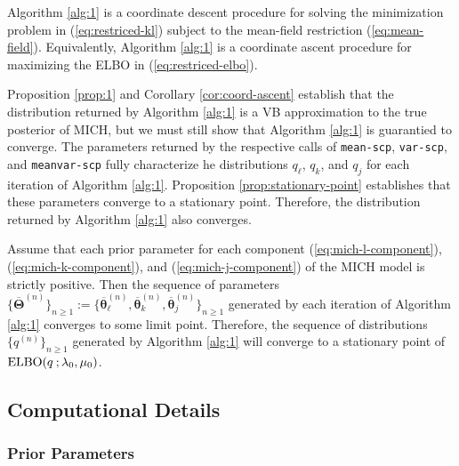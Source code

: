 \begin{corollary}
\label{cor:coord-ascent}
Algorithm \ref{alg:1} is a coordinate descent procedure for solving the minimization problem in (\ref{eq:restriced-kl}) subject to the mean-field restriction (\ref{eq:mean-field}). Equivalently, Algorithm \ref{alg:1} is a coordinate ascent procedure for maximizing the ELBO in (\ref{eq:restriced-elbo}).
\end{corollary}

Proposition \ref{prop:1} and Corollary \ref{cor:coord-ascent} establish that the distribution returned by Algorithm \ref{alg:1} is a VB approximation to the true posterior of MICH, but we must still show that Algorithm \ref{alg:1} is guarantied to converge. The parameters returned by the respective calls of \texttt{mean-scp}, \texttt{var-scp}, and \texttt{meanvar-scp} fully characterize he distributions $q_\ell$, $q_k$, and $q_j$ for each iteration of Algorithm \ref{alg:1}. Proposition \ref{prop:stationary-point} establishes that these parameters converge to a stationary point. Therefore, the distribution returned by Algorithm \ref{alg:1} also converges. 

\begin{proposition}
\label{prop:stationary-point}
Assume that each prior parameter for each component (\ref{eq:mich-l-component}), (\ref{eq:mich-k-component}), and (\ref{eq:mich-j-component}) of the MICH model is strictly positive. Then the sequence of parameters $\{\overline{\boldsymbol{\Theta}}^{(n)}\}_{n \geq 1} := \{\overline{\boldsymbol{\theta}}_\ell^{(n)}, \overline{\boldsymbol{\theta}}_k^{(n)}, \overline{\boldsymbol{\theta}}_j^{(n)}\}_{n\geq 1}$ generated by each iteration of Algorithm \ref{alg:1} converges to some limit point. Therefore, the sequence of distributions $\{q^{(n)}\}_{n\geq 1}$ generated by Algorithm \ref{alg:1} will converge to a stationary point of $\text{\normalfont ELBO}(q\:;\lambda_0, \mu_0)$.
\end{proposition}

\subsection{Computational Details}

\subsubsection{Prior Parameters}


